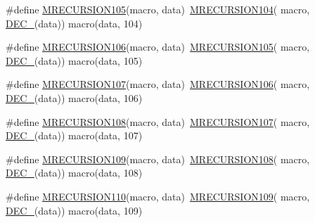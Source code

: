 \begin{DoxyCompactItemize}
\item 
\#define \mbox{\hyperlink{group__group__sam0__utils__mrecursion_ga80adb30156191477474dbaaea95ae1cd}{M\+R\+E\+C\+U\+R\+S\+I\+O\+N105}}(macro,  data)~\mbox{\hyperlink{group__group__sam0__utils__mrecursion_ga25a6fddabb19c7e2b9d332ca28726ab8}{M\+R\+E\+C\+U\+R\+S\+I\+O\+N104}}(  macro, \mbox{\hyperlink{group__group__sam0__utils__mrecursion_ga1d23d683797679dca8c3512a54a5dcae}{D\+E\+C\+\_\+}}(data))   macro(data, 104)
\item 
\#define \mbox{\hyperlink{group__group__sam0__utils__mrecursion_gaddf3759d5e5b4aa3627ee44ea6e71cce}{M\+R\+E\+C\+U\+R\+S\+I\+O\+N106}}(macro,  data)~\mbox{\hyperlink{group__group__sam0__utils__mrecursion_ga80adb30156191477474dbaaea95ae1cd}{M\+R\+E\+C\+U\+R\+S\+I\+O\+N105}}(  macro, \mbox{\hyperlink{group__group__sam0__utils__mrecursion_ga1d23d683797679dca8c3512a54a5dcae}{D\+E\+C\+\_\+}}(data))   macro(data, 105)
\item 
\#define \mbox{\hyperlink{group__group__sam0__utils__mrecursion_ga49eb823fe885fa9aee81242dc9265a4e}{M\+R\+E\+C\+U\+R\+S\+I\+O\+N107}}(macro,  data)~\mbox{\hyperlink{group__group__sam0__utils__mrecursion_gaddf3759d5e5b4aa3627ee44ea6e71cce}{M\+R\+E\+C\+U\+R\+S\+I\+O\+N106}}(  macro, \mbox{\hyperlink{group__group__sam0__utils__mrecursion_ga1d23d683797679dca8c3512a54a5dcae}{D\+E\+C\+\_\+}}(data))   macro(data, 106)
\item 
\#define \mbox{\hyperlink{group__group__sam0__utils__mrecursion_gab36414caa07c8e1c5010b0715d72c018}{M\+R\+E\+C\+U\+R\+S\+I\+O\+N108}}(macro,  data)~\mbox{\hyperlink{group__group__sam0__utils__mrecursion_ga49eb823fe885fa9aee81242dc9265a4e}{M\+R\+E\+C\+U\+R\+S\+I\+O\+N107}}(  macro, \mbox{\hyperlink{group__group__sam0__utils__mrecursion_ga1d23d683797679dca8c3512a54a5dcae}{D\+E\+C\+\_\+}}(data))   macro(data, 107)
\item 
\#define \mbox{\hyperlink{group__group__sam0__utils__mrecursion_ga1f65b89088c75778a8e1a57272204963}{M\+R\+E\+C\+U\+R\+S\+I\+O\+N109}}(macro,  data)~\mbox{\hyperlink{group__group__sam0__utils__mrecursion_gab36414caa07c8e1c5010b0715d72c018}{M\+R\+E\+C\+U\+R\+S\+I\+O\+N108}}(  macro, \mbox{\hyperlink{group__group__sam0__utils__mrecursion_ga1d23d683797679dca8c3512a54a5dcae}{D\+E\+C\+\_\+}}(data))   macro(data, 108)
\item 
\#define \mbox{\hyperlink{group__group__sam0__utils__mrecursion_ga6e8affd87de0ca5058d3864a21b71971}{M\+R\+E\+C\+U\+R\+S\+I\+O\+N110}}(macro,  data)~\mbox{\hyperlink{group__group__sam0__utils__mrecursion_ga1f65b89088c75778a8e1a57272204963}{M\+R\+E\+C\+U\+R\+S\+I\+O\+N109}}(  macro, \mbox{\hyperlink{group__group__sam0__utils__mrecursion_ga1d23d683797679dca8c3512a54a5dcae}{D\+E\+C\+\_\+}}(data))   macro(data, 109)

\end{DoxyCompactItemize}
